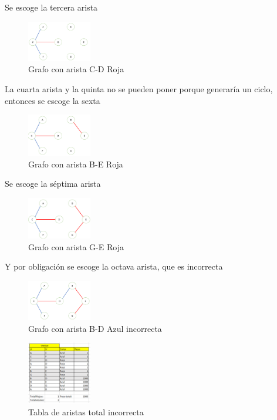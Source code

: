 \documentclass[conference,compsoc]{IEEEtran}
\begin{document}
Se escoge la tercera arista

\begin{figure}[h] 
    \centering
    \includegraphics[width=0.25\textwidth]{Problema2/s7.png}
    \caption{Grafo con arista C-D Roja}
    \label{fig:mesh1}
\end{figure}

La cuarta arista y la quinta no se pueden poner porque generaría un ciclo, entonces se escoge la sexta

\begin{figure}[h]
    \centering
    \includegraphics[width=0.25\textwidth]{Problema2/s8.png}
    \caption{Grafo con arista B-E Roja}
    \label{fig:mesh1}
\end{figure}
$$$$$$$$
Se escoge la séptima arista

\begin{figure}[h] 
    \centering
    \includegraphics[width=0.25\textwidth]{Problema2/s9.png}
    \caption{Grafo con arista G-E Roja}
    \label{fig:mesh1}
\end{figure}

Y por obligación se escoge la octava arista, que es incorrecta

\begin{figure}[h] 
    \centering
    \includegraphics[width=0.25\textwidth]{Problema2/s10.png}
    \caption{Grafo con arista B-D Azul incorrecta}
    \label{fig:mesh1}
\end{figure}

\begin{figure}[h] 
    \centering
    \includegraphics[width=0.25\textwidth]{Problema2/s11.png}
    \caption{Tabla de aristas total incorrecta}
    \label{fig:mesh1}
\end{figure}
\end{document}
